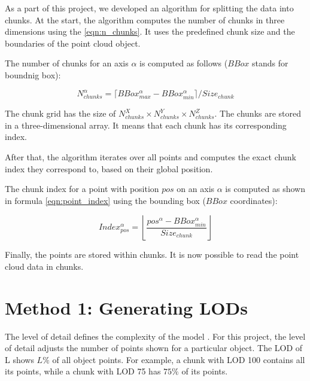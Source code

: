 As a part of this project, we developed an algorithm for splitting the data into chunks. At the start, the algorithm computes the number of chunks in three dimensions using the \autoref{eqn:n_chunks}. It uses the predefined chunk size and the boundaries of the point cloud object.

The number of chunks for an axis $\alpha$ is computed as follows ($BBox$ stands for boundnig box):

\begin{equation}
\label{eqn:n_chunks}
N_{chunks}^\alpha = \lceil BBox_{max}^\alpha - BBox_{min}^\alpha \rceil / Size_{chunk}
\end{equation}

The chunk grid has the size of $N_{chunks}^X \times N_{chunks}^Y \times N_{chunks}^Z$. The chunks are stored in a three-dimensional array. It means that each chunk has its corresponding index.

After that, the algorithm iterates over all points and computes the exact chunk index they correspond to, based on their global position.

The chunk index for a point with position $pos$ on an axis $\alpha$ is computed as shown in formula \ref{eqn:point_index} using the bounding box ($BBox$ coordinates):

\begin{equation}
\label{eqn:point_index}
Index_{pos}^\alpha = \left \lfloor \frac{pos^{\alpha} - BBox_{min}^\alpha}{Size_{chunk}} \right \rfloor
\end{equation}

Finally, the points are stored within chunks. It is now possible to read the point cloud data in chunks.


\section{Method 1: Generating LODs}
\label{sec:generating_lods}

The level of detail defines the complexity of the model \cite{Luebke2002}. For this project, the level of detail adjusts the number of points shown for a particular object.
The LOD of L shows $L\%$ of all object points. For example, a chunk with LOD 100 contains all its points, while a chunk with LOD 75 has $75\%$ of its points.

